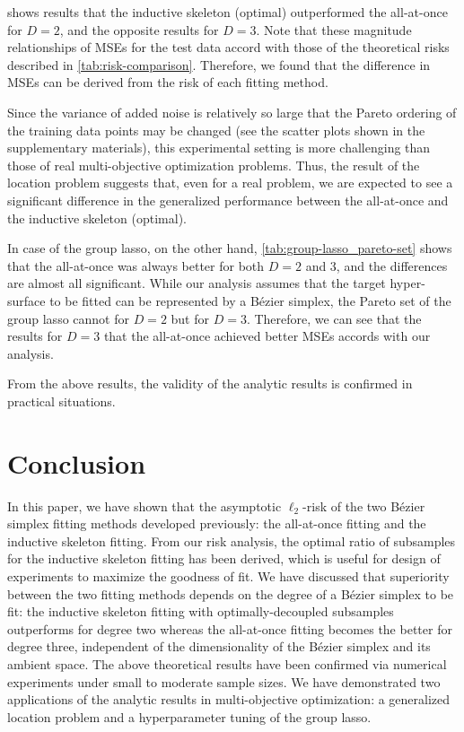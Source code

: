 \documentclass[letterpaper]{article} %
\theoremstyle{plain}
\begin{document}
 shows results that the inductive skeleton (optimal) outperformed the all-at-once for $D = 2$, and the opposite results for $D = 3$.
Note that these magnitude relationships of MSEs for the test data accord with those of the theoretical risks described in \cref{tab:risk-comparison}.
Therefore, we found that the difference in MSEs can be derived from the risk of each fitting method.

Since the variance of added noise is relatively so large that the Pareto ordering of the training data points may be changed (see the scatter plots shown in the supplementary materials), this experimental setting is more challenging than those of real multi-objective optimization problems.
Thus, the result of the location problem suggests that, even for a real problem, we are expected to see a significant difference in the generalized performance between the all-at-once and the inductive skeleton (optimal).

In case of the group lasso, on the other hand, \cref{tab:group-lasso_pareto-set} shows that the all-at-once was always better for both $D = 2$ and 3, and the differences are almost all significant.
While our analysis assumes that the target hyper-surface to be fitted can be represented by a B\'ezier simplex, the Pareto set of the group lasso cannot for $D = 2$ but for $D = 3$.
Therefore, we can see that the results for $D = 3$ that the all-at-once achieved better MSEs accords with our analysis.

From the above results, the validity of the analytic results is confirmed in practical situations.

\section{Conclusion}\label{sec:conclusion}
In this paper, we have shown that the asymptotic $\ell_2$-risk of the two B\'ezier simplex fitting methods developed previously: the all-at-once fitting and the inductive skeleton fitting.
From our risk analysis, the optimal ratio of subsamples for the inductive skeleton fitting has been derived, which is useful for design of experiments to maximize the goodness of fit.
We have discussed that superiority between the two fitting methods depends on the degree of a B\'ezier simplex to be fit: the inductive skeleton fitting with optimally-decoupled subsamples outperforms for degree two whereas the all-at-once fitting becomes the better for degree three, independent of the dimensionality of the B\'ezier simplex and its ambient space.
The above theoretical results have been confirmed via numerical experiments under small to moderate sample sizes.
We have demonstrated two applications of the analytic results in multi-objective optimization: a generalized location problem and a hyperparameter tuning of the group lasso.
\end{document}
